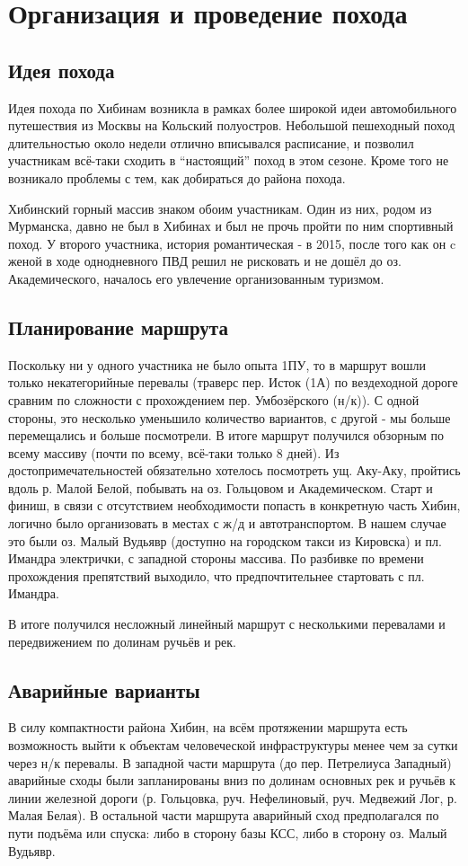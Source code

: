 \section{Организация и проведение похода}
\subsection{Идея похода}
Идея похода по Хибинам возникла в рамках более широкой идеи автомобильного путешествия из Москвы на Кольский полуостров.
Небольшой пешеходный поход длительностью около недели отлично вписывался расписание, и позволил участникам
всё-таки сходить в ``настоящий'' поход в этом сезоне. Кроме того не возникало проблемы с тем, как добираться до района похода.

Хибинский горный массив знаком обоим участникам. Один из них, родом из Мурманска, давно не был в Хибинах и был не прочь
пройти по ним спортивный поход. У второго участника, история романтическая - в 2015, после того как он c женой
в ходе однодневного ПВД решил не рисковать и не дошёл до оз. Академического, началось его увлечение организованным туризмом.

\subsection{Планирование маршрута}
Поскольку ни у одного участника не было опыта 1ПУ, то в маршрут вошли только некатегорийные перевалы
(траверс пер. Исток (1А) по вездеходной дороге сравним по сложности с прохождением пер. Умбозёрского (н/к)).
С одной стороны, это несколько уменьшило количество вариантов, с другой - мы больше перемещались и больше посмотрели.
В итоге маршрут получился обзорным по всему массиву (почти по всему, всё-таки только 8 дней).
Из достопримечательностей обязательно хотелось посмотреть ущ. Аку-Аку, пройтись вдоль р. Малой Белой,
побывать на оз. Гольцовом и Академическом. Старт и финиш, в связи с отсутствием необходимости попасть в
конкретную часть Хибин, логично было организовать в местах с ж/д и автотранспортом.
В нашем случае это были оз. Малый Вудьявр (доступно на городском такси из Кировска) и пл. Имандра электрички,
с западной стороны массива. По разбивке по времени прохождения препятствий выходило, что предпочтительнее стартовать
с пл. Имандра.

В итоге получился несложный линейный маршрут с несколькими перевалами и передвижением по долинам ручьёв и рек.

\subsection{Аварийные варианты}
В силу компактности района Хибин, на всём протяжении маршрута есть возможность выйти к объектам
человеческой инфраструктуры менее чем за сутки через н/к перевалы. В западной части маршрута
(до пер. Петрелиуса Западный) аварийные сходы были запланированы вниз по долинам основных рек и ручьёв к линии
железной дороги (р. Гольцовка, руч. Нефелиновый, руч. Медвежий Лог, р. Малая Белая). В остальной части маршрута
аварийный сход предполагался по пути подъёма или спуска: либо в сторону базы КСС, либо в сторону оз. Малый Вудьявр.


